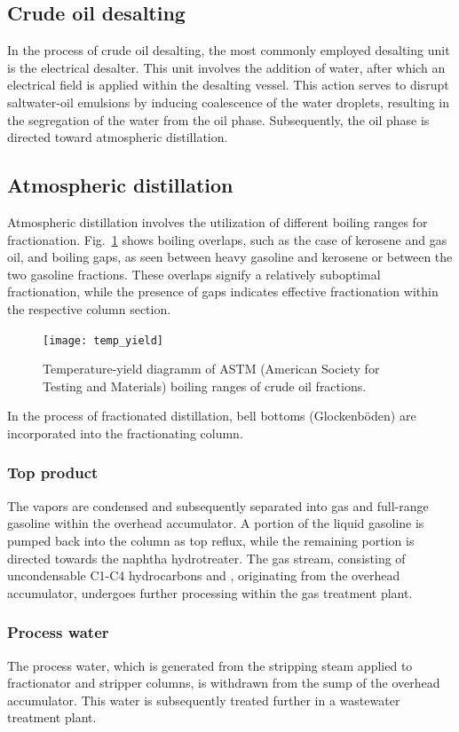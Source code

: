 \subsection{Crude oil desalting}
In the process of crude oil desalting, the most commonly employed desalting unit is the electrical desalter.
This unit involves the addition of water, after which an electrical field is applied within the desalting vessel.
This action serves to disrupt saltwater-oil emulsions by inducing coalescence of the water droplets, resulting in the segregation of the water from the oil phase.
Subsequently, the oil phase is directed toward atmospheric distillation.

\subsection{Atmospheric distillation}
Atmospheric distillation involves the utilization of different boiling ranges for fractionation.
Fig.~\ref{fig:temp_yield} shows boiling overlaps, such as the case of kerosene and gas oil, and boiling gaps, as seen between heavy gasoline and kerosene or between the two gasoline fractions.
These overlaps signify a relatively suboptimal fractionation, while the presence of gaps indicates effective fractionation within the respective column section.

\begin{figure}[H]
    \centering
    \texttt{[image: temp\_yield]}
    \caption{Temperature-yield diagramm of ASTM (American Society for Testing and Materials) boiling ranges of crude oil fractions.}
    \label{fig:temp_yield}
\end{figure}

In the process of fractionated distillation, bell bottoms (Glockenböden) are incorporated into the fractionating column.

\subsubsection{Top product}
The vapors are condensed and subsequently separated into gas and full-range gasoline within the overhead accumulator.
A portion of the liquid gasoline is pumped back into the column as top reflux, while the remaining portion is directed towards the naphtha hydrotreater.
The gas stream, consisting of uncondensable C1-C4 hydrocarbons and , originating from the overhead accumulator, undergoes further processing within the gas treatment plant.

\subsubsection{Process water}
The process water, which is generated from the stripping steam applied to fractionator and stripper columns, is withdrawn from the sump of the overhead accumulator.
This water is subsequently treated further in a wastewater treatment plant.

